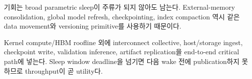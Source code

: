 기회는 broad parametric sleep이 주류가 되지 않아도 남는다. External-memory consolidation, global model
refresh, checkpointing, index compaction 역시 같은 data movement와 versioning primitive를 사용하기 때문이다.

\begin{keypoint}
Kernel compute/HBM roofline 외에 interconnect collective, host/storage ingest, checkpoint write, validation
inference, artifact replication을 end-to-end critical path에 넣는다. Sleep window deadline을 넘기면 다음
wake 전에 publication하지 못하므로 throughput이 곧 utility다.
\end{keypoint}
